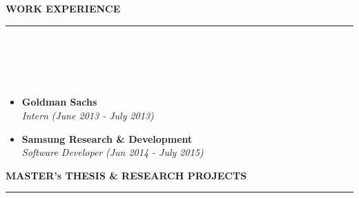 \documentclass[a4paper,10pt]{article}
\newcommand{\lsep}{-0.5cm}
\newcommand{\resheading}[1]{{\small
        {
            \begin{minipage}
                {0.975\textwidth}\textbf{{\textsc{#1 \vphantom{p\^{E}} }}}
                \\[-0.3cm]
                \hrule
            \end{minipage}
            \\[-0.5cm]
        }
 }}
\begin{document}
\resheading{\textbf{\large WORK EXPERIENCE}}\\[\lsep] \\[-0.4cm]
\begin{itemize}
\item \textbf{Goldman Sachs}  \\
    \emph{Intern} \hfill {\emph{(June 2013 - July 2013)}}
    \\[-0.6cm]

\item \textbf{Samsung Research \& Development} \\
    \emph{Software Developer}
    \hfill {\emph{(Jun 2014 - July 2015)}}
    \\ [-0.6cm]
    \end{itemize}
\vspace{0.5cm}
\resheading{\textbf{\large MASTER's THESIS \& RESEARCH PROJECTS}}\\[\lsep]
\\[-0.4cm]
\end{document}
